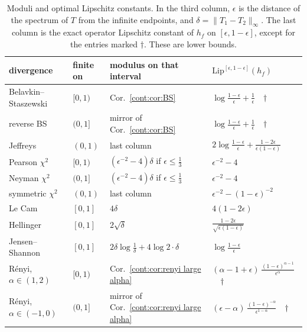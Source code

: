 \begin{table}[htbp]
\centering\small
\begin{tabular}{@{}llll@{}}
\hline
divergence & finite on & modulus on that interval & $\mathrm{Lip}^{[\epsilon,1-\epsilon]}(h_f)$ \\
\hline
Belavkin--Staszewski & $[0,1)$ & Cor.~\ref{cont:cor:BS} & $\log\frac{1-\epsilon}{\epsilon}+\frac1\epsilon$\ \ $\dagger$ \\[2pt]
reverse BS & $(0,1]$ & mirror of Cor.~\ref{cont:cor:BS} & $\log\frac{1-\epsilon}{\epsilon}+\frac1\epsilon$\ \ $\dagger$ \\[2pt]
Jeffreys & $(0,1)$ & last column & $2\log\frac{1-\epsilon}{\epsilon}+\frac{1-2\epsilon}{\epsilon(1-\epsilon)}$ \\[2pt]
Pearson $\chi^2$ & $[0,1)$ & $(\epsilon^{-2}-4)\delta$ if $\epsilon\leq\frac13$ & $\epsilon^{-2}-4$ \\[2pt]
Neyman $\chi^2$ & $(0,1]$ & $(\epsilon^{-2}-4)\delta$ if $\epsilon\leq\frac13$ & $\epsilon^{-2}-4$ \\[2pt]
symmetric $\chi^2$ & $(0,1)$ & last column & $\epsilon^{-2}-(1-\epsilon)^{-2}$ \\[2pt]
Le Cam & $[0,1]$ & $4\delta$ & $4(1-2\epsilon)$ \\[2pt]
Hellinger & $[0,1]$ & $2\sqrt\delta$ & $\frac{1-2\epsilon}{\sqrt{\epsilon(1-\epsilon)}}$ \\[2pt]
Jensen--Shannon & $[0,1]$ & $2\delta\log\frac1\delta+4\log2\cdot\delta$ & $\log\frac{1-\epsilon}{\epsilon}$ \\[2pt]
R\'enyi, $\alpha\in(1,2)$ & $[0,1)$ & Cor.~\ref{cont:cor:renyi large alpha} & $(\alpha-1+\epsilon)\,\frac{(1-\epsilon)^{\alpha-1}}{\epsilon^{\alpha}}$\ \ $\dagger$ \\[2pt]
R\'enyi, $\alpha\in(-1,0)$ & $(0,1]$ & mirror of Cor.~\ref{cont:cor:renyi large alpha} & $(\epsilon-\alpha)\,\frac{(1-\epsilon)^{-\alpha}}{\epsilon^{1-\alpha}}$\ \ $\dagger$ \\
\hline
\end{tabular}
\caption{Moduli and optimal Lipschitz constants. In the third column, $\epsilon$ is the distance of the spectrum of $T$ from the infinite endpoints, and $\delta=\|T_1-T_2\|_\infty$. The last column is the exact operator Lipschitz constant of $h_f$ on $[\epsilon,1-\epsilon]$, except for the entries marked $\dagger$. These are lower bounds.}
\label{cont:tab:lipschitz}
\end{table}
 
